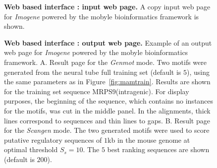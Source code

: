 \documentclass[a4,center,fleqn]{NAR}
\begin{document}
\begin{figure}[!htbp]
\begin{center} 
\end{center}
\caption{
    {\bf Web based interface : input web page.} A copy 
    input web page for {\em Imogene} powered by the mobyle bioinformatics
    framework is shown. 
    }
    \label{fig:interfacein}
\end{figure}

        \begin{figure}[!htbp]
\begin{center} 
\end{center}
\caption{ {\bf Web based interface : output web page.}
    Example of an output web page for {\em Imogene} powered by the mobyle
    bioinformatics framework.
    A. Result page for the {\em Genmot} mode.
    Two motifs were generated from the neural tube full training set (default
    is $5$), using the same parameters as in Figure~\ref{fig:mamtrain}.
    Results are shown for the training set sequence MRPS9(intragenic). For
    display purposes, the beginning of the sequence, which contains no
    instances for the motifs, was cut in the middle panel. In the
    alignments, thick lines correspond to sequences and thin lines to gaps.
    B. Result page for the {\em Scangen} mode.
    The two generated motifs were used to score putative regulatory sequences
    of $1$kb in the mouse genome at optimal threshold $S_s=10$.
    The $5$ best ranking sequences are shown (default is $200$).}
    \label{fig:interfaceout}
\end{figure}
  
  
  
\end{document}

